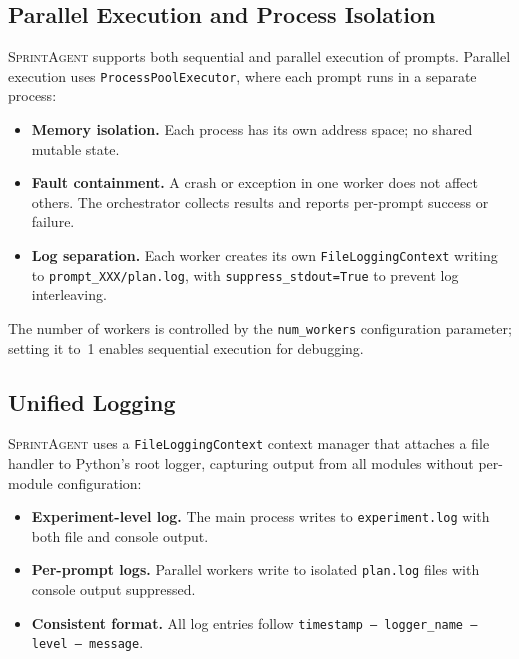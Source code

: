 \documentclass[11pt, a4paper]{article}
\newcommand{\sprintagent}{\textsc{SprintAgent}}
\begin{document}
\subsection{Parallel Execution and Process Isolation}
\label{sec:parallel}

\sprintagent{} supports both sequential and parallel execution of
prompts.  Parallel execution uses \texttt{ProcessPoolExecutor}, where
each prompt runs in a separate process:

\begin{itemize}[leftmargin=*]
  \item \textbf{Memory isolation.}  Each process has its own address
    space; no shared mutable state.
  \item \textbf{Fault containment.}  A crash or exception in one worker
    does not affect others.  The orchestrator collects results and
    reports per-prompt success or failure.
  \item \textbf{Log separation.}  Each worker creates its own
    \texttt{FileLoggingContext} writing to
    \texttt{prompt\_XXX/plan.log}, with \texttt{suppress\_stdout=True}
    to prevent log interleaving.
\end{itemize}

The number of workers is controlled by the \texttt{num\_workers}
configuration parameter; setting it to~1 enables sequential execution
for debugging.

\subsection{Unified Logging}
\label{sec:logging}

\sprintagent{} uses a \texttt{FileLoggingContext} context manager that
attaches a file handler to Python's root logger, capturing output from
all modules without per-module configuration:

\begin{itemize}[leftmargin=*]
  \item \textbf{Experiment-level log.}  The main process writes to
    \texttt{experiment.log} with both file and console output.
  \item \textbf{Per-prompt logs.}  Parallel workers write to isolated
    \texttt{plan.log} files with console output suppressed.
  \item \textbf{Consistent format.}  All log entries follow
    \texttt{timestamp -- logger\_name -- level -- message}.
\end{itemize}
\end{document}
